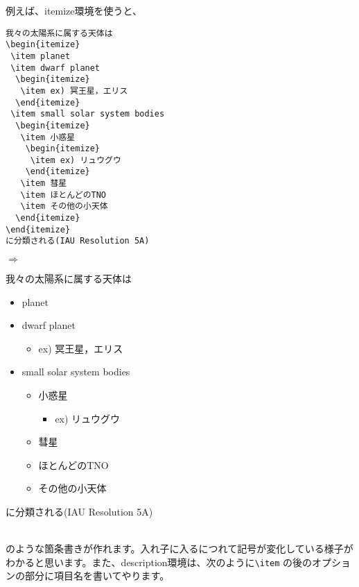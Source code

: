 例えば、itemize環境を使うと、\\
\begin{minipage}[c]{.50\textwidth}
\begin{screen}
\small
\begin{verbatim}
我々の太陽系に属する天体は
\begin{itemize}
 \item planet
 \item dwarf planet
  \begin{itemize}
   \item ex) 冥王星，エリス
  \end{itemize}
 \item small solar system bodies
  \begin{itemize}
   \item 小惑星
    \begin{itemize}
     \item ex) リュウグウ
    \end{itemize}
   \item 彗星
   \item ほとんどのTNO
   \item その他の小天体
  \end{itemize}
\end{itemize}
に分類される(IAU Resolution 5A)
\end{verbatim}
\end{screen}
\end{minipage}%
$\Rightarrow$
\begin{minipage}{.45\textwidth}
\begin{shadebox}
我々の太陽系に属する天体は
\begin{itemize}
 \item planet
 \item dwarf planet
  \begin{itemize}
   \item ex) 冥王星，エリス
  \end{itemize}
 \item small solar system bodies
  \begin{itemize}
   \item 小惑星
    \begin{itemize}
     \item ex) リュウグウ
    \end{itemize}
   \item 彗星
   \item ほとんどのTNO
   \item その他の小天体
  \end{itemize}
\end{itemize}
に分類される(IAU Resolution 5A)
\end{shadebox}
\end{minipage}
\vspace*{1mm}\\
のような箇条書きが作れます。入れ子に入るにつれて記号が変化している様子が
わかると思います。また、description環境は、次のように\verb+\item+
の後のオプションの部分に項目名を書いてやります。\\

